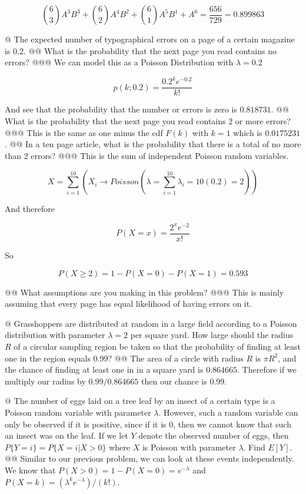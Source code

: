 \documentclass[10pt]{article}
\begin{document}
\begin{easylist}[enumerate]
    \[ \binom{6}{3}A^3B^3 + \binom{6}{2}A^4B^2 + \binom{6}{1} A^5B^1 + A^6 = \frac{656}{729} = \boxed{0.899863} \]

    @ The expected number of typographical errors on a page of a certain magazine is 0.2.
    @@  What is the probability that the next page you read contains no errors?
    @@@ We can model this as a Poisson Distribution with $\lambda = 0.2$

    \[
        p(k;0.2) = \frac{0.2^k e^{-0.2} }{k!}
    \]

    And see that the probability that the number or errors is zero is $\boxed{0.818731}$.
    @@ What is the probability that the next page you read contains 2 or more errors?
    @@@ This is the same as one minus the cdf $F(k)$ with $k=1$ which is $\boxed{0.0175231}$.
    @@ In a ten page article, what is the probability that there is a total of no more than 2 errors?
    @@@ This is the sum of independent Poisson random variables.

    \[ X = \sum_{i=1}^{10} \left( X_i \to Poisson\left(\lambda = \sum_{i=1}^{10} \lambda_i = 10(0.2) = 2\right)\right) \]

    And therefore

    \[ P(X=x) = \frac{2^x e^{-2} }{x!} \]

    So

    \[
        P(X \ge 2) = 1 - P(X=0) - P(X=1) = \boxed{0.593}
    \]

    @@ What assumptions are you making in this problem?
    @@@ This is mainly assuming that every page has equal likelihood of having errors on it.

    @ Grasshoppers are distributed at random in a large field according to a Poisson distribution with parameter
    $\lambda = 2$ per square yard. How large should the radius $R$ of a circular sampling region be taken so that the
    probability of finding at least one in the region equals 0.99?
    @@ The area of a circle with radius $R$ is $\pi R^2$, and the chance of finding at least one in in a square yard is
    $\boxed{0.864665}$. Therefore if we multiply our radius by $\boxed{0.99/0.864665}$ then our chance is 0.99.

    @ The number of eggs laid on a tree leaf by an insect of a certain type is a Poisson random variable with parameter
    $\lambda$. However, such a random variable can only be observed if it is positive, since if it is 0, then we cannot
    know that such an insect was on the leaf. If we let $Y$ denote the observed number of eggs, then $P\{Y = i\} = P\{X
    = i |X > 0\}$ where $X$ is Poisson with parameter $\lambda$. Find $E[Y]$.
    @@ Similar to our previous problem, we can look at these events independently. We know that $P(X > 0)=1-P(X =
    0)=e^{-\lambda}$ and $P(X=k) = (\lambda^k e^{-\lambda})/(k!)$.


\end{easylist}
\end{document}

